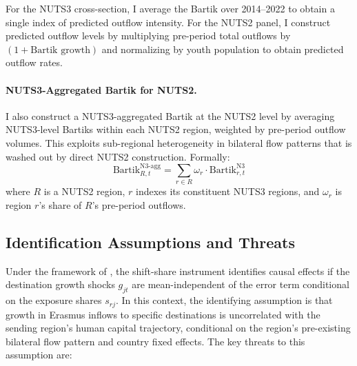 \documentclass[12pt]{article}
\begin{document}
For the NUTS3 cross-section, I average the Bartik over 2014--2022 to obtain a single index of predicted outflow intensity. For the NUTS2 panel, I construct predicted outflow levels by multiplying pre-period total outflows by $(1 + \text{Bartik growth})$ and normalizing by youth population to obtain predicted outflow rates.

\paragraph{NUTS3-Aggregated Bartik for NUTS2.} I also construct a NUTS3-aggregated Bartik at the NUTS2 level by averaging NUTS3-level Bartiks within each NUTS2 region, weighted by pre-period outflow volumes. This exploits sub-regional heterogeneity in bilateral flow patterns that is washed out by direct NUTS2 construction. Formally:
\begin{equation}
\text{Bartik}_{R,t}^{\text{N3-agg}} = \sum_{r \in R} \omega_r \cdot \text{Bartik}_{r,t}^{\text{N3}}
\end{equation}
where $R$ is a NUTS2 region, $r$ indexes its constituent NUTS3 regions, and $\omega_r$ is region $r$'s share of $R$'s pre-period outflows.

\subsection{Identification Assumptions and Threats}

Under the framework of \citet{borusyak_hull_jaravel_2022}, the shift-share instrument identifies causal effects if the destination growth shocks $g_{jt}$ are mean-independent of the error term conditional on the exposure shares $s_{rj}$. In this context, the identifying assumption is that growth in Erasmus inflows to specific destinations is uncorrelated with the sending region's human capital trajectory, conditional on the region's pre-existing bilateral flow pattern and country fixed effects. The key threats to this assumption are:
\end{document}

